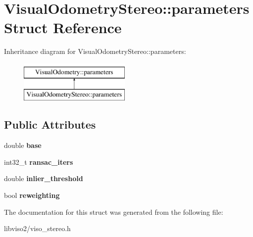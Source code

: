 \hypertarget{struct_visual_odometry_stereo_1_1parameters}{\section{Visual\+Odometry\+Stereo\+:\+:parameters Struct Reference}
\label{struct_visual_odometry_stereo_1_1parameters}
}
Inheritance diagram for Visual\+Odometry\+Stereo\+:\+:parameters\+:\begin{figure}[H]
\begin{center}
\leavevmode
\includegraphics[height=2.000000cm]{struct_visual_odometry_stereo_1_1parameters}
\end{center}
\end{figure}
\subsection*{Public Attributes}
\begin{DoxyCompactItemize}
\item 
\hypertarget{struct_visual_odometry_stereo_1_1parameters_a94fac7929d0e5b260b72c0b57f838442}{double {\bfseries base}}\label{struct_visual_odometry_stereo_1_1parameters_a94fac7929d0e5b260b72c0b57f838442}

\item 
\hypertarget{struct_visual_odometry_stereo_1_1parameters_aefa853196599b4edb25b7f7fc722e938}{int32\+\_\+t {\bfseries ransac\+\_\+iters}}\label{struct_visual_odometry_stereo_1_1parameters_aefa853196599b4edb25b7f7fc722e938}

\item 
\hypertarget{struct_visual_odometry_stereo_1_1parameters_a55acc43c6570ef1d76abd7a69cc2e0fe}{double {\bfseries inlier\+\_\+threshold}}\label{struct_visual_odometry_stereo_1_1parameters_a55acc43c6570ef1d76abd7a69cc2e0fe}

\item 
\hypertarget{struct_visual_odometry_stereo_1_1parameters_ac17f9b3c1ed1480f57fb02c4eaf517f1}{bool {\bfseries reweighting}}\label{struct_visual_odometry_stereo_1_1parameters_ac17f9b3c1ed1480f57fb02c4eaf517f1}

\end{DoxyCompactItemize}


The documentation for this struct was generated from the following file\+:\begin{DoxyCompactItemize}
\item 
libviso2/viso\+\_\+stereo.\+h\end{DoxyCompactItemize}
